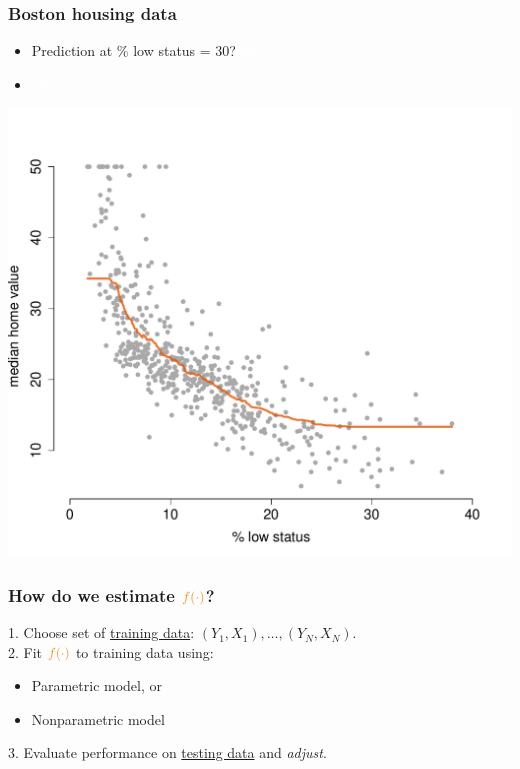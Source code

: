 \documentclass{beamer}
\newcommand{\bo}[1]{\textcolor{burntorange}{#1}}
\begin{document}
\begin{frame}[plain]
\frametitle{Boston housing data}
\vspace{5mm}
\begin{itemize}
\item[] Prediction at \bo{\% low status} = 30? \textcolor{white}{fill}
\item[] \textcolor{white}{fill}
\end{itemize}
\vspace{-16mm}
\begin{center}
\includegraphics[scale=.39]{DaveBostonplot3.pdf}
\end{center}

\end{frame}

\begin{frame}[plain]
\frametitle{How do we estimate $\bo{f(\cdot)}$?}
\vspace{7mm}
1. Choose set of \underline{training data}: $(Y_{1},X_{1}), \dots,(Y_{N},X_{N})$.
\\
\pause
\vspace{7mm}
2. Fit $\bo{f(\cdot)}$ to training data using:
\vspace{7mm}
\begin{itemize}
\item Parametric model, or
\item Nonparametric model
\end{itemize}
\pause
\vspace{7mm}
3. Evaluate performance on \underline{testing data} and \textit{adjust}.

\end{frame}
\end{document}

